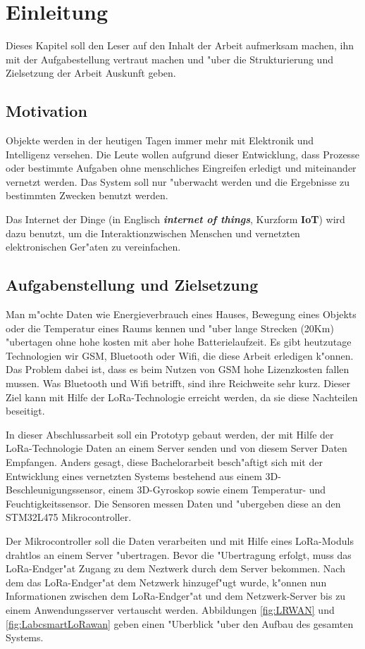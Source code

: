 
\chapter{Einleitung}

Dieses Kapitel soll den Leser auf den Inhalt der Arbeit aufmerksam 
machen, ihn mit der Aufgabestellung vertraut machen und "uber die 
Strukturierung und Zielsetzung der Arbeit Auskunft geben.


\section{Motivation}
Objekte werden in der heutigen Tagen immer mehr mit Elektronik und 
Intelligenz versehen. Die Leute wollen aufgrund dieser Entwicklung, dass 
Prozesse oder bestimmte Aufgaben ohne menschliches Eingreifen erledigt 
und miteinander vernetzt werden. Das System soll nur "uberwacht werden 
und die Ergebnisse zu bestimmten Zwecken benutzt werden.

Das Internet der Dinge (in Englisch \textbf{\textit{internet of 
things}}, Kurzform \textbf{IoT}) wird dazu benutzt, um die 
Interaktionzwischen Menschen und vernetzten elektronischen Ger"aten zu 
vereinfachen. 


\section{Aufgabenstellung und Zielsetzung}
Man m"ochte Daten wie Energieverbrauch eines Hauses, Bewegung eines 
Objekts oder die Temperatur eines Raums kennen und "uber lange Strecken 
(20Km) "ubertagen ohne hohe kosten mit aber hohe Batterielaufzeit. Es 
gibt heutzutage Technologien wir GSM, Bluetooth oder Wifi, die diese 
Arbeit erledigen k"onnen. Das Problem dabei ist, dass es beim Nutzen von 
GSM hohe Lizenzkosten fallen mussen. Was Bluetooth und Wifi betrifft, 
sind ihre Reichweite sehr kurz. Dieser Ziel kann mit Hilfe der 
LoRa-Technologie erreicht werden, da sie diese Nachteilen beseitigt.  

In dieser Abschlussarbeit soll ein Prototyp gebaut werden, der mit Hilfe
der LoRa-Technologie Daten an einem Server senden und von diesem Server 
Daten Empfangen. Anders gesagt, diese Bachelorarbeit besch"aftigt sich 
mit der Entwicklung eines vernetzten Systems bestehend aus einem 
3D-Beschleunigungssensor, einem 3D-Gyroskop sowie einem Tem\-peratur- 
und Feuchtigkeitssensor. Die Sensoren messen Daten und "ubergeben diese 
an den STM32L475 Mikrocontroller.

Der Mikrocontroller soll die Daten verarbeiten und mit Hilfe eines 
LoRa-Moduls\cite{AT_Command} drahtlos an einem Server "ubertragen. Bevor 
die "Ubertragung erfolgt, muss das LoRa-Endger"at Zugang zu dem Neztwerk 
durch dem Server bekommen. Nach dem das LoRa-Endger"at dem Netzwerk 
hinzugef"ugt wurde, k"onnen nun Informationen zwischen dem 
LoRa-Endger"at und dem Netzwerk-Server bis zu einem Anwendungsserver 
vertauscht werden. Abbildungen \ref{fig:LRWAN} und 
\ref{fig:LabcsmartLoRawan} geben einen "Uberblick "uber den Aufbau des 
gesamten Systems.

